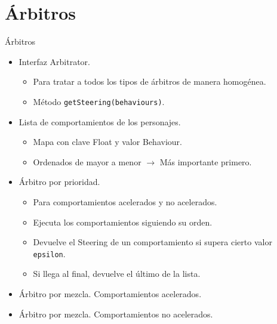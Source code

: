 \documentclass[10pt]{beamer}
\begin{document}
\section{Árbitros}
\begin{frame}{Árbitros}
\begin{itemize}[<+- | alert@+>]
	\item Interfaz Arbitrator.
	\begin{itemize}[<+- | alert@+>]
  		\item Para tratar a todos los tipos de árbitros de manera homogénea.
  		\item Método \texttt{getSteering(behaviours)}.
 	\end{itemize}
	\item Lista de comportamientos de los personajes.
	\begin{itemize}[<+- | alert@+>]
  		\item Mapa con clave Float y valor Behaviour.
  		\item Ordenados de mayor a menor $\rightarrow$ Más importante primero.
 	\end{itemize}
	
	\item Árbitro por prioridad.
	\begin{itemize}[<+- | alert@+>]
  		\item Para comportamientos acelerados y no acelerados.
  		\item Ejecuta los comportamientos siguiendo su orden.
  		\item Devuelve el Steering de un comportamiento si supera cierto valor \texttt{epsilon}.
  		\item Si llega al final, devuelve el último de la lista.
 	\end{itemize}
	\item Árbitro por mezcla. Comportamientos acelerados.
	\item Árbitro por mezcla. Comportamientos no acelerados.
\end{itemize}
\end{frame}
\end{document}
